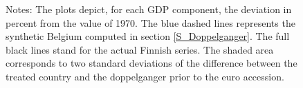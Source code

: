 \documentclass[12pt]{article}
\newcommand{\annote}[1]{\parbox{\textwidth}{\renewcommand{\baselinestretch}{1.0}\vspace{12pt} \small Notes: #1}}
\begin{document}
\begin{appendices}
\begin{figure}[h!]
    \annote{The plots depict, for each GDP component, the deviation in percent from the value of 1970. The blue dashed lines represents the synthetic Belgium computed in section \ref{S_Doppelganger}. The full black lines stand for the actual Finnish series. The shaded area corresponds to two standard deviations of the difference between the treated country and the doppelganger prior to the euro accession. }
\end{figure}


\end{appendices}
\end{document}
